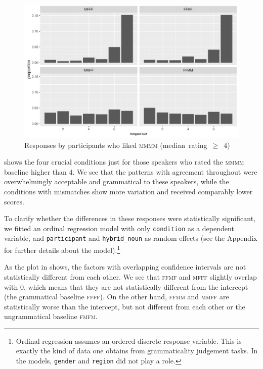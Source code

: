 \documentclass[output=paper,modfonts,newtxmath,hidelinks]{langscibook}
\begin{document}
\begin{figure}[b]
	\centering
	\includegraphics[height=.35\textheight]{figures/14resps-final.pdf}
	\caption{Responses by participants who liked \textsc{mmmm} \mbox{(median rating $\geq$ 4)\hspace*{-6mm}}}\label{14:fig:resps-final}
\end{figure}

 shows the four crucial conditions just for those speakers who rated the \textsc{mmmm} baseline higher than 4. We see that the patterns with  agreement throughout were overwhelmingly acceptable and grammatical to these speakers, while the conditions with mismatches show more variation and received comparably lower scores.

To clarify whether the differences in these responses  were statistically significant, we fitted an ordinal regression model with only \texttt{condition} as a dependent variable, and \texttt{participant} and \texttt{hybrid\_noun} as random effects (see the Appendix for further details about the model).\footnote{Ordinal regression assumes an ordered discrete response variable. This is exactly the kind of data one obtains from grammaticality judgement tasks. In the models, \texttt{gender} and \texttt{region} did not play a role.}		
 
 
As the plot in  shows, the factors with overlapping confidence intervals are not statistically different from each other. 
 We see that \textsc{ffmf} and \textsc{mfff} slightly overlap with 0, which means that they are not statistically different from the intercept (the grammatical baseline \textsc{ffff}). 		
On the other hand, \textsc{ffmm} and \textsc{mmff} are statistically worse than the intercept, but not different from each other or the ungrammatical baseline \textsc{fmfm}.%
\end{document}
